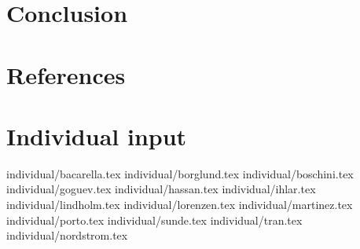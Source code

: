 \documentclass[11pt]{report}
\begin{document}
\chapter{Conclusion}


\chapter{References}

\appendix
\chapter{Individual input}

 {individual/bacarella.tex}
 {individual/borglund.tex}
 {individual/boschini.tex}
 {individual/goguev.tex}
 {individual/hassan.tex}
 {individual/ihlar.tex}
 {individual/lindholm.tex}
 {individual/lorenzen.tex}
 {individual/martinez.tex}
 {individual/porto.tex}
 {individual/sunde.tex}
 {individual/tran.tex}
 {individual/nordstrom.tex}
\end{document}
